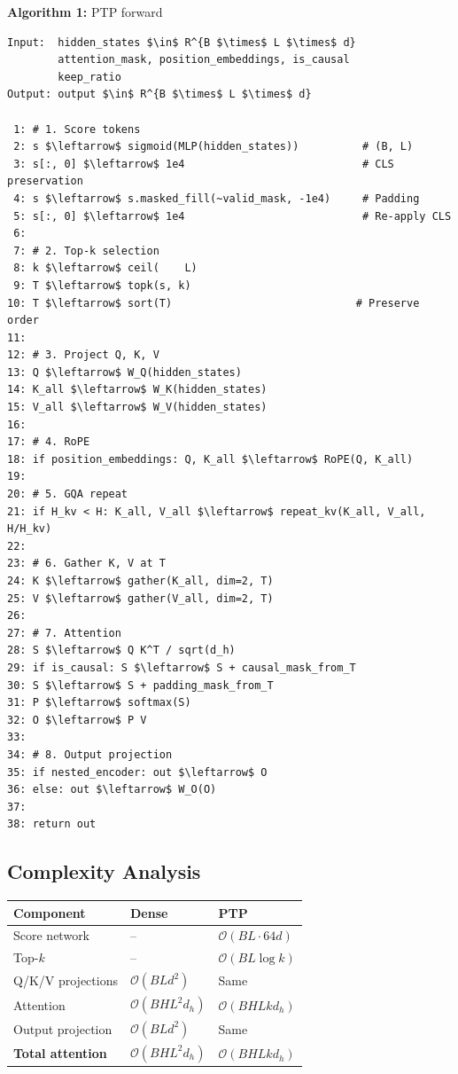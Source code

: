 \textbf{Algorithm 1:} PTP forward
\begin{lstlisting}
Input:  hidden_states $\in$ R^{B $\times$ L $\times$ d}
        attention_mask, position_embeddings, is_causal
        keep_ratio  
Output: output $\in$ R^{B $\times$ L $\times$ d}

 1: # 1. Score tokens
 2: s $\leftarrow$ sigmoid(MLP(hidden_states))          # (B, L)
 3: s[:, 0] $\leftarrow$ 1e4                            # CLS preservation
 4: s $\leftarrow$ s.masked_fill(~valid_mask, -1e4)     # Padding
 5: s[:, 0] $\leftarrow$ 1e4                            # Re-apply CLS
 6:
 7: # 2. Top-k selection
 8: k $\leftarrow$ ceil(    L)
 9: T $\leftarrow$ topk(s, k)
10: T $\leftarrow$ sort(T)                             # Preserve order
11:
12: # 3. Project Q, K, V
13: Q $\leftarrow$ W_Q(hidden_states)
14: K_all $\leftarrow$ W_K(hidden_states)
15: V_all $\leftarrow$ W_V(hidden_states)
16:
17: # 4. RoPE
18: if position_embeddings: Q, K_all $\leftarrow$ RoPE(Q, K_all)
19:
20: # 5. GQA repeat
21: if H_kv < H: K_all, V_all $\leftarrow$ repeat_kv(K_all, V_all, H/H_kv)
22:
23: # 6. Gather K, V at T
24: K $\leftarrow$ gather(K_all, dim=2, T)
25: V $\leftarrow$ gather(V_all, dim=2, T)
26:
27: # 7. Attention
28: S $\leftarrow$ Q K^T / sqrt(d_h)
29: if is_causal: S $\leftarrow$ S + causal_mask_from_T
30: S $\leftarrow$ S + padding_mask_from_T
31: P $\leftarrow$ softmax(S)
32: O $\leftarrow$ P V
33:
34: # 8. Output projection
35: if nested_encoder: out $\leftarrow$ O
36: else: out $\leftarrow$ W_O(O)
37:
38: return out
\end{lstlisting}

\subsection{Complexity Analysis}

\begin{table}[H]
\centering
\small
\begin{tabular}{lll}
\toprule
\textbf{Component} & \textbf{Dense} & \textbf{PTP} \\
\midrule
Score network & -- & $\mathcal{O}(B L \cdot 64 d)$ \\
Top-$k$ & -- & $\mathcal{O}(B L \log k)$ \\
Q/K/V projections & $\mathcal{O}(B L d^2)$ & Same \\
Attention & $\mathcal{O}(B H L^2 d_h)$ & \textbf{$\mathcal{O}(B H L k d_h)$} \\
Output projection & $\mathcal{O}(B L d^2)$ & Same \\
\textbf{Total attention} & $\mathcal{O}(B H L^2 d_h)$ & \textbf{$\mathcal{O}(B H L k d_h)$} \\
\bottomrule
\end{tabular}
\end{table}

